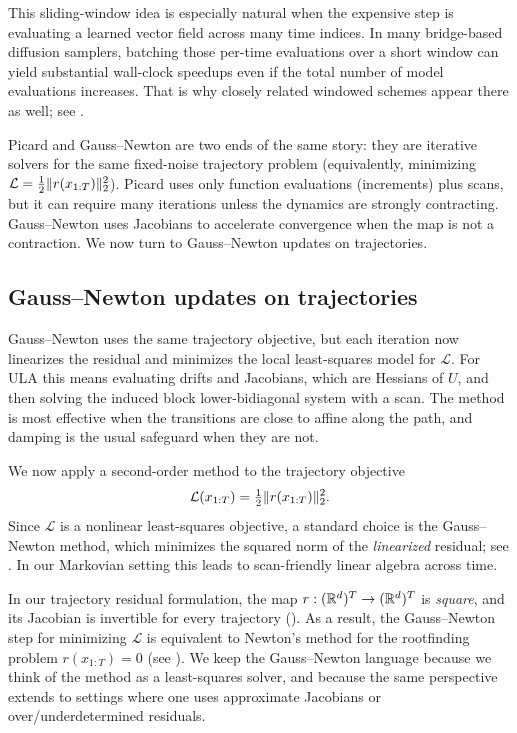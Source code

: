 \documentclass[11pt]{article}
\begin{document}
This sliding-window idea is especially natural when the expensive step is evaluating a learned vector field across many time indices.
In many bridge-based diffusion samplers, batching those per-time evaluations over a short window can yield substantial wall-clock speedups even if the total number of model evaluations increases.
That is why closely related windowed schemes appear there as well; see \citet[\S3.1]{shih_belkhale_ermon_sadigh_anari_2023_parallel_sampling_diffusion}.%

Picard and Gauss--Newton are two ends of the same story: they are iterative solvers for the same fixed-noise trajectory problem (equivalently, minimizing $\mathcal{L}=\tfrac12\lVert r(x_{1:T})\rVert_2^2$).
Picard uses only function evaluations (increments) plus scans, but it can require many iterations unless the dynamics are strongly contracting.
Gauss--Newton uses Jacobians to accelerate convergence when the map is not a contraction.
We now turn to Gauss--Newton updates on trajectories.

\subsection{Gauss--Newton updates on trajectories}
\label{subsec:newton-trajectory}

Gauss--Newton uses the same trajectory objective, but each iteration now linearizes the residual and minimizes the local least-squares model for $\mathcal{L}$.
For ULA this means evaluating drifts and Jacobians, which are Hessians of $U$, and then solving the induced block lower-bidiagonal system with a scan.
The method is most effective when the transitions are close to affine along the path, and damping is the usual safeguard when they are not.

We now apply a second-order method to the trajectory objective
\[
  \mathcal{L}(x_{1:T})=\tfrac12 \lVert r(x_{1:T})\rVert_2^2.
\]
Since $\mathcal{L}$ is a nonlinear least-squares objective, a standard choice is the Gauss--Newton method, which minimizes the squared norm of the \emph{linearized} residual; see .
In our Markovian setting this leads to scan-friendly linear algebra across time.

In our trajectory residual formulation, the map $r:(\mathbb{R}^d)^T\to(\mathbb{R}^d)^T$ is \emph{square}, and its Jacobian is invertible for every trajectory ().
As a result, the Gauss--Newton step for minimizing $\mathcal{L}$ is equivalent to Newton's method for the rootfinding problem $r(x_{1:T})=0$ (see ).
We keep the Gauss--Newton language because we think of the method as a least-squares solver, and because the same perspective extends to settings where one uses approximate Jacobians or over/underdetermined residuals.
\end{document}
